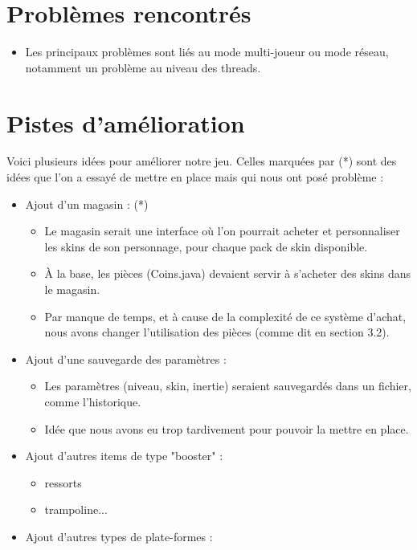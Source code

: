 \documentclass{article}
\begin{document}
\section{Problèmes rencontrés}
\begin{itemize}
    \item Les principaux problèmes sont liés au mode multi-joueur ou mode réseau, notamment un problème au niveau des threads. 
\end{itemize}

\section{Pistes d'amélioration}
Voici plusieurs idées pour améliorer notre jeu. Celles marquées par (*) sont des idées que l'on a essayé de mettre en place mais qui nous ont posé problème :
\begin{itemize}
    \item Ajout d'un magasin : (*)
    \begin{itemize}
        \item Le magasin serait une interface où l'on pourrait acheter et personnaliser les skins de son personnage, pour chaque pack de skin disponible.
        \item À la base, les pièces (Coins.java) devaient servir à s'acheter des skins dans le magasin.
        \item Par manque de temps, et à cause de la complexité de ce système d'achat, nous avons changer l'utilisation des pièces (comme dit en section 3.2).
    \end{itemize}
    \item Ajout d'une sauvegarde des paramètres :
    \begin{itemize}
        \item Les paramètres (niveau, skin, inertie) seraient sauvegardés dans un fichier, comme l'historique.
        \item Idée que nous avons eu trop tardivement pour pouvoir la mettre en place.
    \end{itemize}
    \item Ajout d'autres items de type "booster" :
    \begin{itemize}
        \item ressorts
        \item trampoline...
    \end{itemize}
    \item Ajout d'autres types de plate-formes :
    \begin{itemize}

\end{itemize}
\end{itemize}
\end{document}
